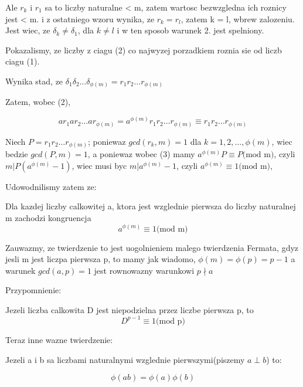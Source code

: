 \documentclass[12]{article}
\begin{document}
Ale $r_{k}$ i $r_{1}$ sa to liczby naturalne < m, zatem wartosc bezwzgledna ich roznicy jest < m. i z ostatniego wzoru wynika, ze $r_{k} = r_{l}$, zatem k = l, wbrew zalozeniu. Jest wiec, ze $\delta_{k} \neq \delta_{1}$, dla $k \neq l$ i w ten sposob warunek 2. jest spelniony.

Pokazalismy, ze liczby z ciagu (2) co najwyzej porzadkiem roznia sie od liczb ciagu (1).

Wynika stad, ze $\delta_{1}\delta_{2}\dots \delta_{\phi(m)} = r_{1}r_{2}\dots r_{\phi(m)}$

Zatem, wobec (2),

\[ \tag{3} ar_{1}ar_{2}\dots ar_{\phi(m)} = a^{\phi(m)}r_{1}r_{2}\dots r_{\phi(m)} \equiv r_{1}r_{2}\dots r_{\phi(m)} \]  

Niech $P = r_{1}r_{2}\dots r_{\phi(m)}$; poniewaz $gcd(r_{k}, m) = 1$ dla $k = 1,2,\dots, \phi(m)$, wiec bedzie $gcd(P, m) = 1$, a poniewaz wobec (3) mamy $a^{\phi(m)}P \equiv P\text{(mod m)}$, czyli $m|P(a^{\phi(m)}-1)$, wiec musi byc $m| a^{\phi(m)}-1$, czyli $a^{\phi(m)}\equiv 1\text{(mod m)}$, 

Udowodnilismy zatem ze:

\begin{tcolorbox}[colback=white!90!blue,colframe=white!35!blue,title=Twierdzenie Eulera]
    Dla kazdej liczby calkowitej a, ktora jest wzglednie pierwsza do liczby naturalnej m zachodzi kongruencja \[ a^{\phi(m)} \equiv 1\text{(mod m)} \]
 
\end{tcolorbox}

Zauwazmy, ze twierdzenie to jest uogolnieniem malego twierdzenia Fermata, gdyz jesli m jest liczpa pierwsza p, to mamy jak wiadomo, $\phi(m) = \phi(p) = p-1$ a warunek $gcd(a,p) = 1$ jest rownowazny warunkowi $p \nmid a$

Przypomnienie:

\begin{tcolorbox}[colback=white!90!blue,colframe=white!35!blue,title=Male twierdzenie Fermata]

    Jezeli liczba calkowita D jest niepodzielna przez liczbe pierwsza p, to 
    \[ D^{p-1} \equiv 1\text{(mod p)} \]

\end{tcolorbox}

Teraz inne wazne twierdzenie:

\begin{tcolorbox}[colback=white!90!blue,colframe=white!35!blue,title=Funkcja Eulera jest funkcja multiplikatywna]

    Jezeli a i b sa liczbami naturalnymi wzglednie pierwszymi(piszemy $a \perp b$) to:

    \[ \phi(ab) = \phi(a)\phi(b) \tag{4}\]

\end{tcolorbox}
\end{document}

